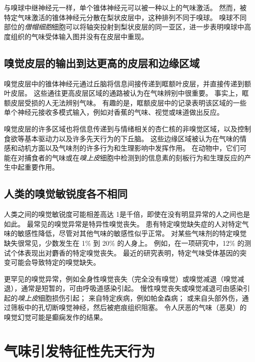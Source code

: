 与嗅球中继神经元一样，单个锥体神经元可以被一种以上的气味激活。
然而，被特定气味激活的锥体神经元分散在梨状皮层中，这种排列不同于嗅球。
嗅球不同部位的\textit{僧帽细胞}细胞可以将轴突投射到梨状皮层的同一亚区，进一步表明嗅球中高度组织的气味受体输入图并没有在皮层中重现。



\subsection{嗅觉皮层的输出到达更高的皮层和边缘区域}

嗅觉皮层中的锥体神经元通过丘脑将信息间接传递到眶额叶皮层，并直接传递到额叶皮层。
这些通往更高皮层区域的通路被认为在气味辨别中很重要。
事实上，眶额皮层受损的人无法辨别气味。
有趣的是，眶额皮层中的记录表明该区域的一些单个神经元接收多模式输入，例如对香蕉的气味、视觉或味道做出反应。


嗅觉皮层的许多区域也将信息传递到与情绪相关的杏仁核的非嗅觉区域，以及控制食欲等基本驱动力以及许多先天行为的下丘脑。
这些边缘区域被认为在气味的情感和动机方面以及气味剂的许多行为和生理影响中发挥作用。
在动物中，它们可能在对捕食者的气味或在\textit{嗅上皮}细胞中检测到的信息素的刻板行为和生理反应的产生中起重要作用。



\subsection{人类的嗅觉敏锐度各不相同}

人类之间的嗅觉敏锐度可能相差高达 1是千倍，即使在没有明显异常的人之间也是如此。
最常见的嗅觉异常是特异性嗅觉丧失。
患有特定嗅觉缺失症的人对特定气味的敏感性降低，尽管对其他气味的敏感性似乎正常。
对某些气味剂的特定嗅觉缺失很常见，少数发生在 1\% 到 20\% 的人身上。
例如，在一项研究中，12\% 的测试个体表现出对麝香的特定嗅觉丧失。
最近的研究表明，特定气味受体基因的突变可能会导致特定的嗅觉缺失。


更罕见的嗅觉异常，例如全身性嗅觉丧失（完全没有嗅觉）或嗅觉减退（嗅觉减退），通常是短暂的，可由呼吸道感染引起。
慢性嗅觉丧失或嗅觉减退可由感染引起的\textit{嗅上皮}细胞损伤引起；
来自特定疾病，例如帕金森病；
或来自头部外伤，通过筛板中的孔切断嗅觉神经，然后被疤痕组织阻塞。
令人厌恶的气味（恶臭）的嗅觉幻觉可能是癫痫发作的结果。



\section{气味引发特征性先天行为}

